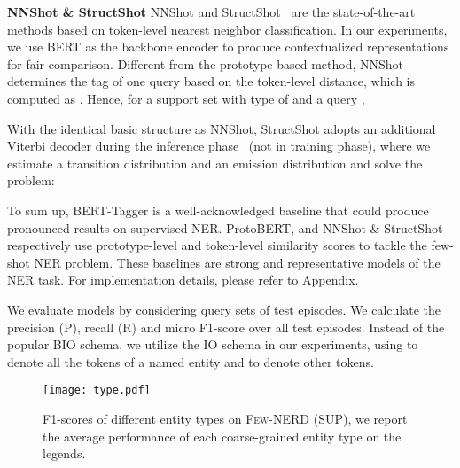 \documentclass[11pt,a4paper, dvipsnames]{article}
\begin{document}
\noindent \textbf{NNShot \& StructShot} \quad NNShot and StructShot~\cite{yang2020simple} are the state-of-the-art methods based on token-level nearest neighbor classification. In our experiments, we use BERT as the backbone encoder to produce contextualized representations for fair comparison. Different from the prototype-based method, NNShot determines the tag of one query based on the token-level distance, which is computed as . Hence, for a support set  with type of  and a query ,


With the identical basic structure as NNShot, StructShot adopts an additional Viterbi decoder during the inference phase~\cite{hou2020few} (not in training phase), where we estimate a transition distribution  and an emission distribution  and  solve the problem:




To sum up, BERT-Tagger is a well-acknowledged baseline that could produce pronounced results on supervised NER. ProtoBERT, and NNShot \& StructShot respectively use prototype-level and token-level similarity scores to tackle the few-shot NER problem. These baselines are strong and representative models of the NER task. For implementation details, please refer to Appendix.

We evaluate models by considering query sets  of test episodes.
We calculate the precision (P), recall (R) and micro F1-score over all test episodes.
Instead of the popular BIO schema, we utilize the IO schema in our experiments, using  to denote all the tokens of a named entity and  to denote other tokens.



\begin{figure*}[ht]
    \centering
    \texttt{[image: type.pdf]}
\caption{F1-scores of different entity types on \textsc{Few-NERD (SUP)}, we report the average performance of each coarse-grained entity type on the legends.}
    \label{fig:types}
\end{figure*}


\begin{table}[]
    \centering
    \caption{Results of BERT-Tagger on previous NER datasets and the supervised setting of .}
    \vspace{-0.3cm}
    \label{tab:sup}
\end{table}
\end{document}
